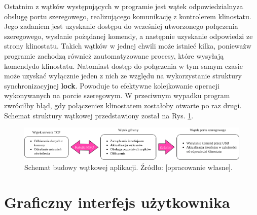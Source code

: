 Ostatnim z wątków występujących w programie jest wątek odpowiedzialny\linebreak za obsługę portu szeregowego, realizującego komunikację z kontrolerem klinostatu. Jego zadaniem jest uzyskanie dostępu do wcześniej utworzonego połączenia szeregowego, wysłanie pożądanej komendy, a następnie uzyskanie odpowiedzi ze strony klinostatu. Takich wątków w jednej chwili może istnieć kilka, ponieważ\linebreak w programie zachodzą również zautomatyzowane procesy, które wysyłają komendy\linebreak do klinostatu. Natomiast dostęp do połączenia w tym samym czasie może uzyskać wyłącznie jeden z nich ze względu na wykorzystanie struktury synchronizacyjnej \textbf{lock}. Powoduje to efektywne kolejkowanie operacji wykonywanych na porcie szeregowym. W przeciwnym wypadku program zwróciłby błąd, gdy połączenie\linebreak z klinostatem zostałoby otwarte po raz drugi. Schemat struktury wątkowej przedstawiony został na Rys. \ref{fig:watki}.

\begin{figure}
	
	\centering
	\includegraphics[scale=0.46]{schemat_watki}
	\caption{Schemat budowy wątkowej aplikacji. Źródło: [opracowanie własne].} 
	\label{fig:watki}
	
\end{figure}

\section{Graficzny interfejs użytkownika}

